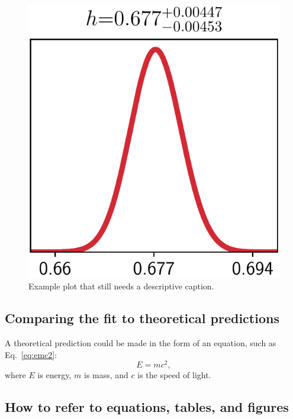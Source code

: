 \documentclass[twocolumn,apj,numberedappendix,appendixfloats]{openjournal}
\begin{document}
\begin{center}
    \begin{figure}[!t]
        \centering
    	\includegraphics[scale=0.3]{figures/probdist.png}
    	\caption{Example plot that still needs a descriptive caption.}
        \label{fig:fig}
    \end{figure}
\end{center}


\subsection{Comparing the fit to theoretical predictions} \label{sec:analysis_comparison}

A theoretical prediction could be made in the form of an equation, such as Eq.~\ref{eq:emc2}:
\begin{equation}
    E = m c^2, \label{eq:emc2}
\end{equation}
where $E$ is energy, $m$ is mass, and $c$ is the speed of light.

\subsection{How to refer to equations, tables, and figures}
\end{document}
